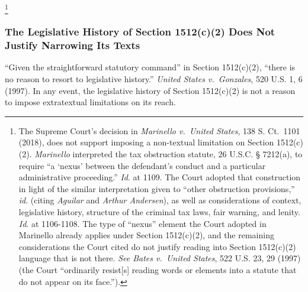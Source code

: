\footnote{The Supreme Court’s decision in \textit{Marinello v.\ United States}, 138 S. Ct.~1101 (2018), does not support imposing a non-textual limitation on Section 1512(c)(2).
\textit{Marinello} interpreted the tax obstruction statute, 26 U.S.C. § 7212(a), to require “a ‘nexus’ between the defendant’s conduct and a particular administrative proceeding.”
\textit{Id}. at 1109.
The Court adopted that construction in light of the similar interpretation given to “other obstruction provisions,” \textit{id}. (citing \textit{Aguilar} and \textit{Arthur Andersen}), as well as considerations of context, legislative history, structure of the criminal tax laws, fair warning, and lenity.
\textit{Id}. at 1106-1108.
The type of “nexus” element the Court adopted in Marinello already applies under Section 1512(c)(2), and the remaining considerations the Court cited do not justify reading into Section 1512(c)(2) language that is not there.
\textit{See Bates v.\ United States}, 522 U.S. 23, 29 (1997) (the Court “ordinarily resist[s] reading words or elements into a statute that do not appear on its face.”).}

\subsubsection{The Legislative History of Section 1512(c)(2) Does Not Justify Narrowing Its Texts}

“Given the straightforward statutory command” in Section 1512(c)(2), “there is no reason to resort to legislative history.”
\textit{United States v.\ Gonzales}, 520 U.S. 1, 6 (1997).
In any event, the legislative history of Section 1512(c)(2) is not a reason to impose extratextual limitations on its reach.

